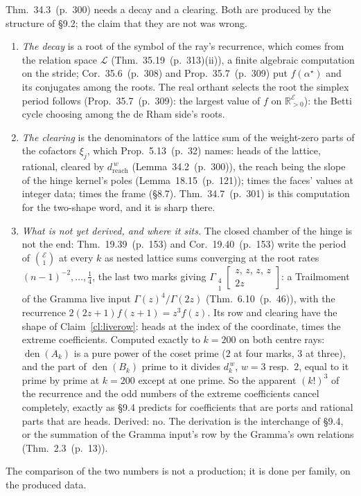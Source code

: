 \documentclass[11pt]{article}
\newcommand{\cE}{\mathcal E}
\newcommand{\Gst}[4]{\Gamma_{\substack{#1\\#2}}\!\begin{bmatrix}#3\\#4\end{bmatrix}}
\newcommand{\hb}[2]{#1~(p.~#2)}   %
\theoremstyle{plain}
\theoremstyle{remark}
\begin{document}
Thm.~\hb{34.3}{300} needs a decay and a clearing. Both are produced by the structure of \S9.2; the claim that they are not was wrong.
\begin{enumerate}[label=(\roman*)]
\item \emph{The decay} is a root of the symbol of the ray's recurrence, which comes from the relation space $\mathcal L$ (Thm.~\hb{35.19}{313}(ii)), a finite algebraic computation on the stride; Cor.~\hb{35.6}{308} and Prop.~\hb{35.7}{309} put $f(\alpha^\star)$ and its conjugates among the roots. The real orthant selects the root the simplex period follows (Prop.~\hb{35.7}{309}: the largest value of $f$ on $\mathbb R^{\cE}_{>0}$): the Betti cycle choosing among the de Rham side's roots.
\item \emph{The clearing} is the denominators of the lattice sum of the weight-zero parts of the cofactors $\xi_j$, which Prop.~\hb{5.13}{32} names: heads of the lattice, rational, cleared by $d_{\mathrm{reach}}^{\,w}$ (Lemma~\hb{34.2}{300}), the reach being the slope of the hinge kernel's poles (Lemma~\hb{18.15}{121}); times the faces' values at integer data; times the frame (\S8.7). Thm.~\hb{34.7}{301} is this computation for the two-shape word, and it is sharp there.
\item \emph{What is not yet derived, and where it sits.} The closed chamber of the hinge is not the end: Thm.~\hb{19.39}{153} and Cor.~\hb{19.40}{153} write the period of $\binom{\cE}1$ at every $k$ as nested lattice sums converging at the root rates $(n-1)^{-2},\dots,\frac14$, the last two marks giving $\Gst41{z,\,z,\,z,\,z}{2z}$: a Trailmoment of the Gramma live input $\Gamma(z)^4/\Gamma(2z)$ (Thm.~\hb{6.10}{46}), with the recurrence $2(2z+1)f(z+1)=z^3f(z)$. Its row and clearing have the shape of Claim~\ref{cl:liverow}: heads at the index of the coordinate, times the extreme coefficients. Computed exactly to $k=200$ on both centre rays: $\operatorname{den}(A_k)$ is a pure power of the coset prime ($2$ at four marks, $3$ at three), and the part of $\operatorname{den}(B_k)$ prime to it divides $d_k^{\,w}$, $w=3$ resp.\ $2$, equal to it prime by prime at $k=200$ except at one prime. So the apparent $(k!)^3$ of the recurrence and the odd numbers of the extreme coefficients cancel completely, exactly as \S9.4 predicts for coefficients that are ports and rational parts that are heads. Derived: no. The derivation is the interchange of \S9.4, or the summation of the Gramma input's row by the Gramma's own relations (Thm.~\hb{2.3}{13}).
\end{enumerate}
The comparison of the two numbers is not a production; it is done per family, on the produced data.
\end{document}
